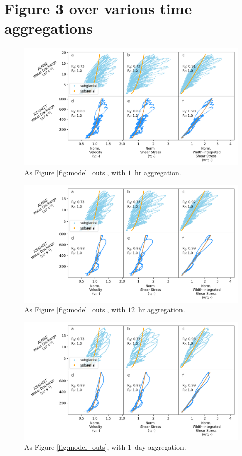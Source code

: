 \documentclass[draft]{agujournal2019}
\newcommand{\unit}[1]{$\mathrm{#1}$}
\begin{document}
\section{Figure 3 over various time aggregations}

\begin{center}
  \begin{figure}[!h]
    \includegraphics[width=0.7\linewidth]{Fig3_hr.png}
    \caption{As Figure \ref{fig:model_outs}, with $1$ \,\unit{hr} aggregation.}
    \label{fig:model_outs_1hr}
  \end{figure}
\end{center}

\begin{center}
  \begin{figure}[!h]
    \includegraphics[width=0.7\linewidth]{Fig3_12hr.png}
    \caption{As Figure \ref{fig:model_outs}, with $12$ \,\unit{hr} aggregation.}
    \label{fig:model_outs_12hr}
  \end{figure}
\end{center}


\begin{center}
  \begin{figure}[!h]
    \includegraphics[width=0.7\linewidth]{Fig3_1day.png}
    \caption{As Figure \ref{fig:model_outs}, with $1$ \,\unit{day} aggregation.}
    \label{fig:model_outs_1day}
  \end{figure}
\end{center}
\end{document}
